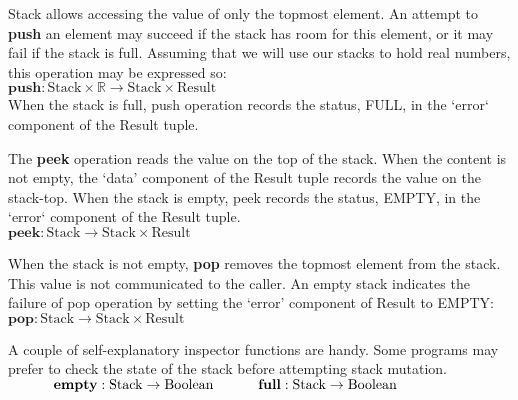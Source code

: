 \documentclass[10pt]{article}
\begin{document}
  Stack allows accessing the value of only the topmost element. An attempt to \textbf{push} an element may succeed if the stack has room for this element, or it may fail if the stack is full. Assuming that we will use our stacks to hold real numbers, this operation may be expressed so:
  \vspace*{6pt}\\\hspace*{32pt}\(
  \textbf{push}: \mathrm{Stack} \times \mathbb{R} \rightarrow \mathrm{Stack \times Result}
  \)\vspace*{6pt}\\
  When the stack is full, push operation records the status, FULL, in the `error` component of the Result tuple.

  The \textbf{peek} operation reads the value on the top of the stack. When the content is not empty, the `data' component of the Result tuple records the value on the stack-top. When the stack is empty, peek records the status, EMPTY, in the `error` component of the Result tuple.
  \vspace*{6pt}\\\hspace*{32pt}\(
  \textbf{peek}: \mathrm{Stack} \rightarrow \mathrm{Stack \times Result}
  \)\vspace*{6pt}

  When the stack is not empty, {\textbf{pop}} removes the topmost element from the stack. This value is not communicated to the caller. An empty stack indicates the failure of pop operation by setting the `error' component of Result to EMPTY:
  \vspace*{6pt}\\\hspace*{32pt}\(
  \textbf{pop}: \mathrm{Stack} \rightarrow \mathrm{Stack \times Result}
  \)\vspace*{6pt}

  A couple of self-explanatory inspector functions are handy. Some programs may prefer to check the state of the stack before attempting stack mutation.
  \vspace*{6pt}\\\(
  \hspace*{32pt}\textbf{empty}: \mathrm{Stack} \rightarrow \mathrm{Boolean}\vspace*{4pt}\\
  \hspace*{32pt}\textbf{full}: \mathrm{Stack} \rightarrow \mathrm{Boolean}
  \)\vspace*{6pt}
\end{document}
